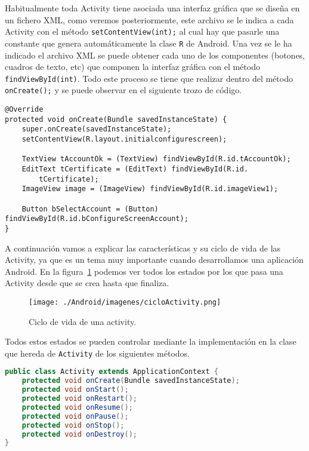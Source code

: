 Habitualmente toda Activity tiene asociada una interfaz gráfica que se diseña en un fichero XML, como veremos posteriormente, este archivo se le indica a cada Activity con el método \lstinline{setContentView(int);} al cual hay que pasarle una constante que genera automáticamente la clase \lstinline{R} de Android. Una vez se le ha indicado el archivo XML se puede obtener cada uno de los componentes (botones, cuadros de texto, etc) que componen la interfaz gráfica con el método \lstinline{findViewById(int)}. Todo este proceso se tiene que realizar dentro del método \lstinline{onCreate();} y se puede observar en el siguiente trozo de código.

\begin{lstlisting}[style=Java]
@Override
protected void onCreate(Bundle savedInstanceState) {
	super.onCreate(savedInstanceState);
	setContentView(R.layout.initialconfigurescreen);

	TextView tAccountOk = (TextView) findViewById(R.id.tAccountOk);
	EditText tCertificate = (EditText) findViewById(R.id.
		tCertificate);
	ImageView image = (ImageView) findViewById(R.id.imageView1);

	Button bSelectAccount = (Button) findViewById(R.id.bConfigureScreenAccount);
}
\end{lstlisting}

A continuación vamos a explicar las características y su ciclo de vida de las Activity, ya que es un tema muy importante cuando desarrollamos una aplicación Android. En la figura~\ref{fig:cicloActivity} podemos ver todos los estados por los que pasa una Activity desde que se crea hasta que finaliza. 

\begin{figure}
  \centering
    \texttt{[image: ./Android/imagenes/cicloActivity.png]}
  \caption{Ciclo de vida de una activity.}
  \label{fig:cicloActivity}
\end{figure}

Todos estos estados se pueden controlar mediante la implementación en la clase que hereda de \lstinline{Activity} de los siguientes métodos.

\begin{lstlisting}[language=Java]
public class Activity extends ApplicationContext {
	protected void onCreate(Bundle savedInstanceState);
	protected void onStart();
	protected void onRestart();
	protected void onResume();
	protected void onPause();
	protected void onStop();
	protected void onDestroy();
}
\end{lstlisting}

